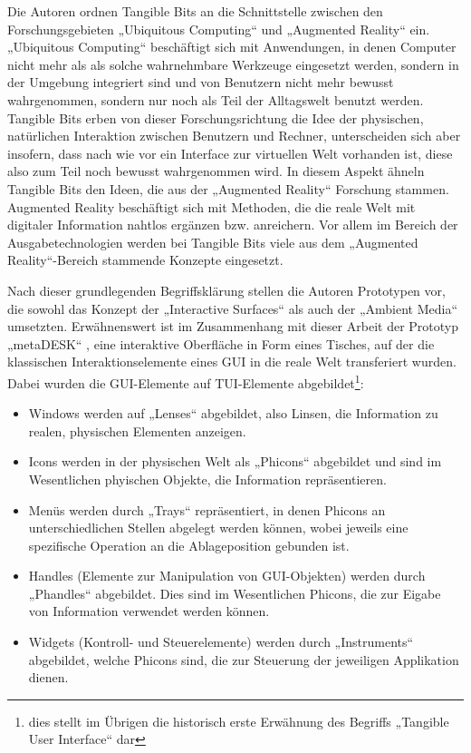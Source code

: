 Die Autoren ordnen Tangible Bits an die Schnittstelle zwischen den Forschungsgebieten „Ubiquitous Computing“ und „Augmented Reality“ ein. „Ubiquitous Computing“ \citep{Weiser91} beschäftigt sich mit Anwendungen, in denen Computer nicht mehr als als solche wahrnehmbare Werkzeuge eingesetzt werden, sondern in der Umgebung integriert sind und von Benutzern nicht mehr bewusst wahrgenommen, sondern nur noch als Teil der Alltagswelt benutzt werden. Tangible Bits erben von dieser Forschungsrichtung die Idee der physischen, natürlichen Interaktion zwischen Benutzern und Rechner, unterscheiden sich aber insofern, dass nach wie vor ein Interface zur virtuellen Welt vorhanden ist, diese also zum Teil noch bewusst wahrgenommen wird. In diesem Aspekt ähneln Tangible Bits den Ideen, die aus der „Augmented Reality“ Forschung stammen. Augmented Reality beschäftigt sich mit Methoden, die die reale Welt mit digitaler Information nahtlos ergänzen bzw. anreichern. Vor allem im Bereich der Ausgabetechnologien werden bei Tangible Bits viele aus dem „Augmented Reality“-Bereich stammende Konzepte eingesetzt.

Nach dieser grundlegenden Begriffsklärung stellen die Autoren Prototypen vor, die sowohl das Konzept der „Interactive Surfaces“ als auch der „Ambient Media“ umsetzten. Erwähnenswert ist im Zusammenhang mit dieser Arbeit der Prototyp „metaDESK“ \citep{Ullmer97}, eine interaktive Oberfläche in Form eines Tisches, auf der die klassischen Interaktionselemente eines \gls{GUI} in die reale Welt transferiert wurden. Dabei wurden die \gls{GUI}-Elemente auf \gls{TUI}-Elemente abgebildet\footnote{dies stellt im Übrigen die historisch erste Erwähnung des Begriffs „Tangible User Interface“ dar}: 
\begin{itemize}
	\item Windows werden auf „Lenses“ abgebildet, also Linsen, die Information zu realen, physischen Elementen anzeigen.
	\item Icons werden in der physischen Welt als „Phicons“ abgebildet und sind im Wesentlichen phyischen Objekte, die Information repräsentieren.
	\item Menüs werden durch „Trays“ repräsentiert, in denen Phicons an unterschiedlichen Stellen abgelegt werden können, wobei jeweils eine spezifische Operation an die Ablageposition gebunden ist. 
	\item Handles (Elemente zur Manipulation von GUI-Objekten) werden durch „Phandles“ abgebildet. Dies sind im Wesentlichen Phicons, die zur Eigabe von Information verwendet werden können.
	\item Widgets (Kontroll- und Steuerelemente) werden durch „Instruments“ abgebildet, welche Phicons sind, die zur Steuerung der jeweiligen Applikation dienen.
\end{itemize}


